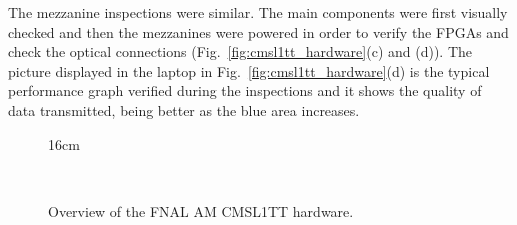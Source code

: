 The mezzanine inspections were similar. The main components were first visually checked and then the mezzanines were powered in order to verify the FPGAs and check the optical connections (Fig.~\ref{fig:cmsl1tt_hardware}(c) and (d)). The picture displayed in the laptop in Fig.~\ref{fig:cmsl1tt_hardware}(d) is the typical performance graph verified during the inspections and it shows the quality of data transmitted, being better as the blue area increases.

\begin{figure}[htbp]{16cm}
	\caption{Overview of the FNAL AM CMSL1TT hardware.}
	\centering
	\quad
	\\

\end{figure}

